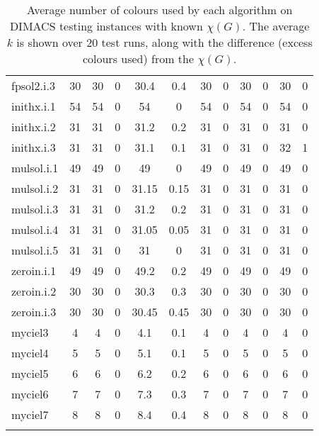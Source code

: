 \begin{longtable}{|>{\raggedright}p{2.3cm}|c|c|c|c|c|c|c|c|c|c|c|}
    fpsol2.i.3 & 30 & 30 & 0 & 30.4 & 0.4 & 30 & 0 & 30 & 0 & 30 & 0 \\
    inithx.i.1 & 54 & 54 & 0 & 54 & 0 & 54 & 0 & 54 & 0 & 54 & 0 \\
    inithx.i.2 & 31 & 31 & 0 & 31.2 & 0.2 & 31 & 0 & 31 & 0 & 31 & 0 \\
    inithx.i.3 & 31 & 31 & 0 & 31.1 & 0.1 & 31 & 0 & 31 & 0 & 32 & 1 \\
    mulsol.i.1 & 49 & 49 & 0 & 49 & 0 & 49 & 0 & 49 & 0 & 49 & 0 \\
    mulsol.i.2 & 31 & 31 & 0 & 31.15 & 0.15 & 31 & 0 & 31 & 0 & 31 & 0 \\
    mulsol.i.3 & 31 & 31 & 0 & 31.2 & 0.2 & 31 & 0 & 31 & 0 & 31 & 0 \\
    mulsol.i.4 & 31 & 31 & 0 & 31.05 & 0.05 & 31 & 0 & 31 & 0 & 31 & 0 \\
    mulsol.i.5 & 31 & 31 & 0 & 31 & 0 & 31 & 0 & 31 & 0 & 31 & 0 \\
    zeroin.i.1 & 49 & 49 & 0 & 49.2 & 0.2 & 49 & 0 & 49 & 0 & 49 & 0 \\
    zeroin.i.2 & 30 & 30 & 0 & 30.3 & 0.3 & 30 & 0 & 30 & 0 & 30 & 0 \\
    zeroin.i.3 & 30 & 30 & 0 & 30.45 & 0.45 & 30 & 0 & 30 & 0 & 30 & 0 \\
    myciel3 & 4 & 4 & 0 & 4.1 & 0.1 & 4 & 0 & 4 & 0 & 4 & 0 \\
    myciel4 & 5 & 5 & 0 & 5.1 & 0.1 & 5 & 0 & 5 & 0 & 5 & 0 \\
    myciel5 & 6 & 6 & 0 & 6.2 & 0.2 & 6 & 0 & 6 & 0 & 6 & 0 \\
    myciel6 & 7 & 7 & 0 & 7.3 & 0.3 & 7 & 0 & 7 & 0 & 7 & 0 \\
    myciel7 & 8 & 8 & 0 & 8.4 & 0.4 & 8 & 0 & 8 & 0 & 8 & 0 \\
    \hline
  \caption{Average number of colours used by each algorithm on DIMACS testing instances with known $\chi(G)$. The average $k$ is shown over 20 test runs, along with the difference (excess colours used) from the $\chi(G)$.}
\label{tab:DIMACSResults}
\end{longtable}



